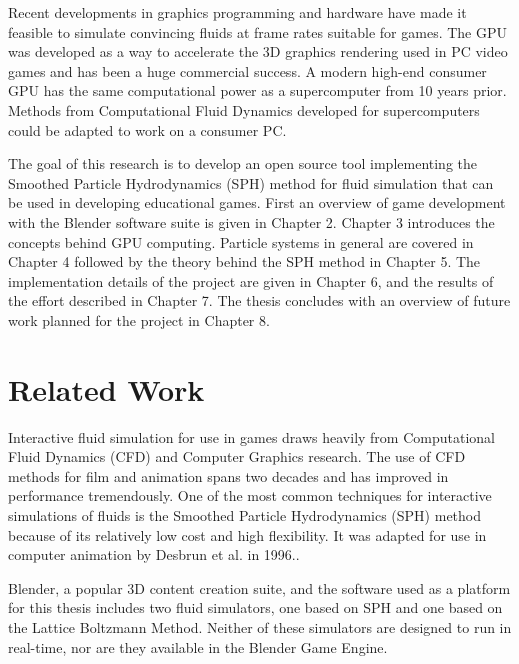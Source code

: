 Recent developments in graphics programming and hardware have made it feasible
to simulate convincing fluids at frame rates suitable for games. The GPU was
developed as a way to accelerate the 3D graphics rendering used in PC video
games and has been a huge commercial success. A modern high-end consumer GPU
has the same computational power as a supercomputer from 10 years prior.
Methods from Computational Fluid Dynamics developed for supercomputers could be
adapted to work on a consumer PC.


The goal of this research is to develop an open source tool implementing the
Smoothed Particle Hydrodynamics (SPH) method for fluid simulation that can be
used in developing educational games. First an overview of game development
with the Blender software suite is given in Chapter 2.  
Chapter 3 introduces the concepts behind GPU computing. Particle systems in
general are covered in Chapter 4 followed by the theory behind the SPH method
in Chapter 5. The implementation details of the project are given in Chapter 6,
and the results of the effort described in Chapter 7. The thesis concludes with
an overview of future work planned for the project in Chapter 8. 


\section{Related Work}

Interactive fluid simulation for use in games draws heavily from Computational
Fluid Dynamics (CFD) and Computer Graphics research. The use of CFD methods for
film and animation spans two decades\cite{Tan2009} and has improved in
performance tremendously. One of the most common techniques for interactive
simulations of fluids is the Smoothed Particle Hydrodynamics (SPH) method
because of its relatively low cost and high flexibility. It was adapted for use
in computer animation by Desbrun et al. in 1996.\cite{Desbrun1996}. 


Blender, a popular 3D content creation suite, and the software used as a
platform for this thesis includes two fluid simulators, one based on SPH\cite{Clavet2005} and
one based on the Lattice Boltzmann Method\cite{Nils2006}. Neither of these simulators are
designed to run in real-time, nor are they available in the Blender Game
Engine. 


